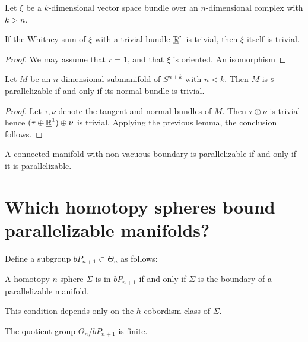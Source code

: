 Let $\xi$ be a $k$-dimensional vector space bundle over an $n$-dimensional complex with $k>n$.
\begin{lemma}
If the Whitney sum of $\xi$ with a trivial bundle $\underline{\mathbb{R}}^r$ is trivial, then $\xi$ itself is trivial.
\end{lemma}

\begin{proof}
	We may assume that $r=1$, and that $\xi$ is oriented. An isomorphism 
\end{proof}

\begin{lemma}
	Let $M$ be an $n$-dimensional submanifold of $S^{n+k}$ with $n<k$. Then $M$ is \textsc{s}-parallelizable if and only if its normal bundle is trivial.
\end{lemma}

\begin{proof}
	Let $\tau, \nu$ denote the tangent and normal bundles of $M$. Then $\tau\oplus \nu$ is trivial hence $(\tau\oplus \underline{\mathbb{R}}^1)\oplus \nu$ is trivial. Applying the previous lemma, the conclusion follows.
\end{proof}

\begin{lemma}
	A connected manifold with non-vacuous boundary is parallelizable if and only if it is parallelizable.
\end{lemma}

\section{Which homotopy spheres bound parallelizable manifolds?}

Define a subgroup $bP_{n+1} \subset \Theta_n$ as follows:

A homotopy $n$-sphere $\Sigma$ is in $bP_{n+1}$ if and only if $\Sigma$ is the boundary of a parallelizable manifold.

\begin{claim}
	This condition depends only on the $h$-cobordism class of $\Sigma$.
\end{claim}

\begin{theorem}
	The quotient group $\Theta_n / bP_{n+1}$ is finite.
\end{theorem}

